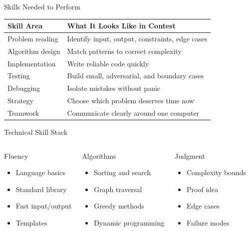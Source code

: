 \documentclass[aspectratio=169,11pt]{beamer}
\newenvironment{cpbox}[1]{%
  \begin{block}{#1}
  }{%
  \end{block}
}
\newcommand{\rulecard}[2]{%
  \begin{cpbox}{#1}
    #2
  \end{cpbox}
}
\begin{document}
\begin{frame}{Skills Needed to Perform}
  \begin{center}
  \small
  \begin{tabular}{@{}ll@{}}
    \toprule
    Skill Area & What It Looks Like in Contest \\
    \midrule
    Problem reading & Identify input, output, constraints, edge cases \\
    Algorithm design & Match patterns to correct complexity \\
    Implementation & Write reliable code quickly \\
    Testing & Build small, adversarial, and boundary cases \\
    Debugging & Isolate mistakes without panic \\
    Strategy & Choose which problem deserves time now \\
    Teamwork & Communicate clearly around one computer \\
    \bottomrule
  \end{tabular}
  \end{center}
\end{frame}

\begin{frame}{Technical Skill Stack}
  \begin{columns}[T,onlytextwidth]
      \rulecard{Fluency}{
        \begin{itemize}
          \item Language basics
          \item Standard library
          \item Fast input/output
          \item Templates
        \end{itemize}
      }

      \rulecard{Algorithms}{
        \begin{itemize}
          \item Sorting and search
          \item Graph traversal
          \item Greedy methods
          \item Dynamic programming
        \end{itemize}
      }

      \rulecard{Judgment}{
        \begin{itemize}
          \item Complexity bounds
          \item Proof idea
          \item Edge cases
          \item Failure modes
        \end{itemize}
      }
  \end{columns}
\end{frame}
\end{document}
